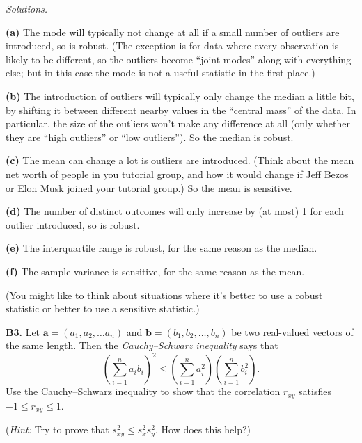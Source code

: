 \documentclass[
  a4paper,
]{book}
\theoremstyle{definition}
\theoremstyle{definition}
\theoremstyle{definition}
\theoremstyle{definition}
\theoremstyle{remark}
\begin{document}
\begin{myanswers}
\emph{Solutions.}

\textbf{(a)} The mode will typically not change at all if a small number of outliers are introduced, so is robust. (The exception is for data where every observation is likely to be different, so the outliers become ``joint modes'' along with everything else; but in this case the mode is not a useful statistic in the first place.)

\textbf{(b)} The introduction of outliers will typically only change the median a little bit, by shifting it between different nearby values in the ``central mass'' of the data. In particular, the size of the outliers won't make any difference at all (only whether they are ``high outliers'' or ``low outliers''). So the median is robust.

\textbf{(c)} The mean can change a lot is outliers are introduced. (Think about the mean net worth of people in you tutorial group, and how it would change if Jeff Bezos or Elon Musk joined your tutorial group.) So the mean is sensitive.

\textbf{(d)} The number of distinct outcomes will only increase by (at most) 1 for each outlier introduced, so is robust.

\textbf{(e)} The interquartile range is robust, for the same reason as the median.

\textbf{(f)} The sample variance is sensitive, for the same reason as the mean.

(You might like to think about situations where it's better to use a robust statistic or better to use a sensitive statistic.)

\end{myanswers}

\textbf{B3.} Let \(\mathbf a = (a_1, a_2, \dots a_n)\) and \(\mathbf b = (b_1, b_2, \dots, b_n)\) be two real-valued vectors of the same length. Then the \emph{Cauchy--Schwarz inequality} says that
\[ \left( \sum_{i=1}^n a_i b_i \right)^2 \leq \left( \sum_{i=1}^n a_i^2 \right) \left(\sum_{i=1}^n b_i^2 \right) . \]
Use the Cauchy--Schwarz inequality to show that the correlation \(r_{xy}\) satisfies \(-1 \leq r_{xy} \leq 1\).

(\emph{Hint:} Try to prove that \(s_{xy}^2 \leq s_x^2 s_y^2\). How does this help?)
\end{document}
